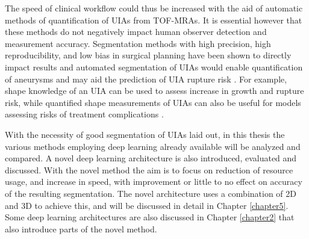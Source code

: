 The speed of clinical workflow could thus be increased with the aid of automatic methods of quantification of UIAs from TOF-MRAs. It is essential however that these methods do not negatively impact human observer detection and measurement accuracy. Segmentation methods with high precision, high reproducibility, and low bias in surgical planning have been shown to directly impact results and automated segmentation of UIAs would enable quantification of aneurysms and may aid the prediction of UIA rupture risk \cite{Taha2015} . For example, shape knowledge of an UIA can be used to assess increase in growth and rupture risk, while quantified shape measurements of UIAs can also be useful for models assessing risks of treatment complications \cite{backes2017elapss, ji2016risk}.

With the necessity of good segmentation of UIAs laid out, in this thesis the various methods employing deep learning already available will be analyzed and compared. A novel deep learning architecture is also introduced, evaluated and discussed. With the novel method the aim is to focus on reduction of resource usage, and increase in speed, with improvement or little to no effect on accuracy of the resulting segmentation. The novel architecture uses a combination of 2D and 3D to achieve this, and will be discussed in detail in Chapter \ref{chapter5}. Some deep learning architectures are also discussed in Chapter \ref{chapter2} that also introduce parts of the novel method. 







